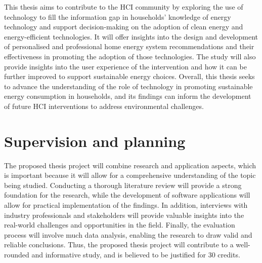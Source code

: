 

This thesis aims to contribute to the HCI community by exploring the use of technology to fill the information gap in households' knowledge of energy technology and support decision-making on the adoption of clean energy and energy-efficient technologies. 
It will offer insights into the design and development of personalised and professional home energy system recommendations and their effectiveness in promoting the adoption of those technologies. 
The study will also provide insights into the user experience of the intervention and how it can be further improved to support sustainable energy choices. 
Overall, this thesis seeks to advance the understanding of the role of technology in promoting sustainable energy consumption in households, and its findings can inform the development of future HCI interventions to address environmental challenges. 


\section{Supervision and planning} 

The proposed thesis project will combine research and application aspects, 
which is important because it will allow for a comprehensive understanding of the topic being studied. 
Conducting a thorough literature review will provide a strong foundation for the research, 
while the development of software applications will allow for practical implementation of the findings. 
In addition, interviews with industry professionals and stakeholders will provide valuable insights into the real-world challenges and opportunities in the field. 
Finally, the evaluation process will involve much data analysis, enabling the research to draw valid and reliable conclusions. 
Thus, the proposed thesis project will contribute to a well-rounded and informative study, and is believed to be justified for 30 credits.


